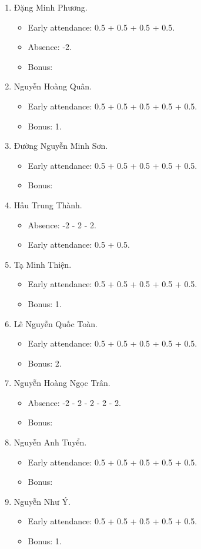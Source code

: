 \documentclass{article}
\begin{document}
\begin{enumerate}
\begin{itemize}
	\end{itemize}
	\item {\sc Đặng Minh Phương.}
	\begin{itemize}
		\item Early attendance: 0.5 + 0.5 + 0.5 + 0.5.
		\item Absence: -2.
		\item Bonus: 
	\end{itemize}
	\item {\sc Nguyễn Hoàng Quân.}
	\begin{itemize}
		\item Early attendance: 0.5 + 0.5 + 0.5 + 0.5 + 0.5.
		\item Bonus: 1.
	\end{itemize}
	\item {\sc Đường Nguyễn Minh Sơn.}
	\begin{itemize}
		\item Early attendance: 0.5 + 0.5 + 0.5 + 0.5 + 0.5.
		\item Bonus: 
	\end{itemize}
	\item {\sc Hấu Trung Thành.}
	\begin{itemize}
		\item Absence: -2 - 2 - 2.
		\item Early attendance: 0.5 + 0.5.
	\end{itemize}
	\item {\sc Tạ Minh Thiện.}
	\begin{itemize}
		\item Early attendance: 0.5 + 0.5 + 0.5 + 0.5 + 0.5.
		\item Bonus: 1.
	\end{itemize}
	\item {\sc Lê Nguyễn Quốc Toàn.}
	\begin{itemize}
		\item Early attendance: 0.5 + 0.5 + 0.5 + 0.5 + 0.5.
		\item Bonus: 2.
	\end{itemize}
	\item {\sc Nguyễn Hoàng Ngọc Trân.}
	\begin{itemize}
		\item Absence: -2 - 2 - 2 - 2 - 2.
		\item Bonus: 
	\end{itemize}
	\item {\sc Nguyễn Anh Tuyển.}
	\begin{itemize}
		\item Early attendance: 0.5 + 0.5 + 0.5 + 0.5 + 0.5.
		\item Bonus: 
	\end{itemize}
	\item {\sc Nguyễn Như Ý.}
	\begin{itemize}
		\item Early attendance: 0.5 + 0.5 + 0.5 + 0.5 + 0.5.
		\item Bonus: 1.
	\end{itemize}
\end{enumerate}
\end{document}
